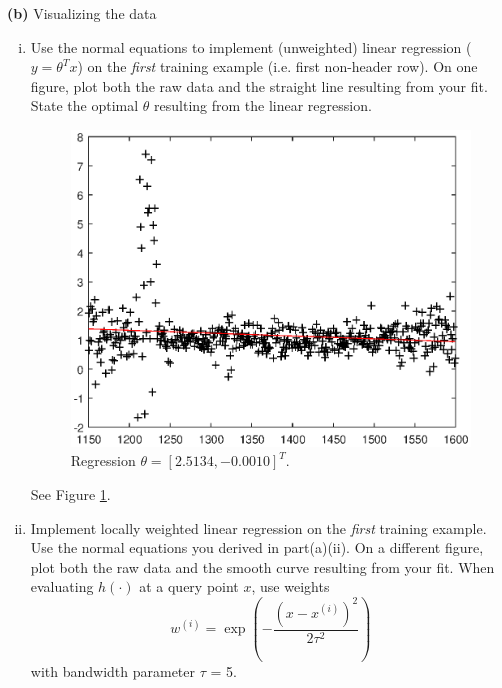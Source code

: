 \documentclass[11pt]{article}
\renewcommand\part[1]{\vspace{.10in}\textbf{(#1)  }}
\begin{document}
\part{b}Visualizing the data
\begin{enumerate}[i.]
  \item Use the normal equations to implement (unweighted) linear regression ($y = \theta^T x$) on the \emph{first} training example (i.e. first non-header row). On one figure, plot both the raw data and the straight line resulting from your fit. State the optimal $\theta$ resulting from the linear regression.
\begin{figure}[htb]
  \centering
  \includegraphics{ps1q5pbi}
  \caption{Regression $\theta = [2.5134 ,-0.0010]^T$.}\label{ps1q5pbi}
\end{figure}

See Figure \ref{ps1q5pbi}.

  \item Implement locally weighted linear regression on the \emph{first} training example. Use the normal equations you derived in part(a)(ii). On a different figure, plot both the raw data and the smooth curve resulting from your fit. When evaluating $h(\cdot)$ at a query point $x$, use weights $$w^{(i)} = \exp\left(-\frac{(x-x^{(i)})^2}{2\tau^2}\right)$$
      with bandwidth parameter $\tau$ = 5.


\end{enumerate}
\end{document}
